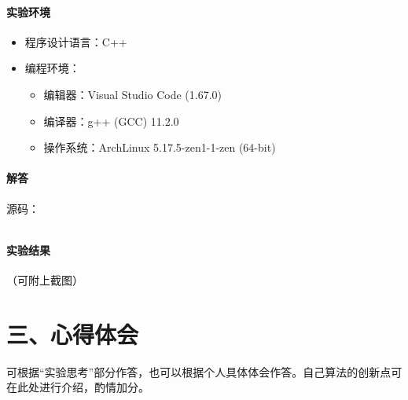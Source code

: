 \documentclass[12pt,a4paper]{ctexart}
\begin{document}
\vspace{5pt}

\paragraph{实验环境}
\begin{itemize}
    \item 程序设计语言：C++
    \item 编程环境：
    \begin{itemize}
        \item 编辑器：Visual Studio Code (1.67.0)
        \item 编译器：g++ (GCC) 11.2.0
        \item 操作系统：ArchLinux 5.17.5-zen1-1-zen (64-bit)
    \end{itemize}
\end{itemize}

\vspace{5pt}

\paragraph{解答}

源码：
\inputminted[bgcolor=codebg,frame=lines,autogobble,linenos=true,breaklines]{cpp}{src/b.cpp}

\vspace{5pt}

\paragraph{实验结果}
（可附上截图）

\newpage

\section*{三、心得体会}
    可根据“实验思考”部分作答，也可以根据个人具体体会作答。自己算法的创新点可在此处进行介绍，酌情加分。
\end{document}
